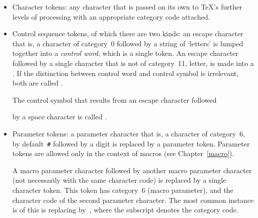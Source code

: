 \documentclass{book}
\begin{document}
\begin{itemize}\item Character tokens: any character that is
	passed on its own to \TeX's
further levels of processing with an appropriate
category code attached.
\item Control sequence tokens, of which there are two kinds:
	an escape character 
\ldash that is,
a character of category~0 \rdash  followed
by a string of `letters' is
lumped together into a {\em control word}, which is a single token.
An escape character followed by a single character that is not of
category~11, letter, is made into a 
.
If the distinction between control word and control symbol is
irrelevant, both are called 
.

The control symbol that results from an escape character followed
\csterm {}\par
by a space character is called 
.

\item Parameter tokens: a parameter character \ldash that is, a
  character of category~6, by default~\verb=#=
  \rdash followed by a digit  is replaced by a parameter
  token.  Parameter tokens are allowed only in the context of macros
  (see Chapter~\ref{macro}).

A macro parameter character followed by another macro parameter
character (not necessarily with the same character code)
is replaced by a single character token.
This token has category~6 (macro parameter), and the character
code of the second parameter character.
The most common instance is of this is
replacing \n{\#\#} by~, where the subscript
denotes the category code.

\end{itemize}
\end{document}
